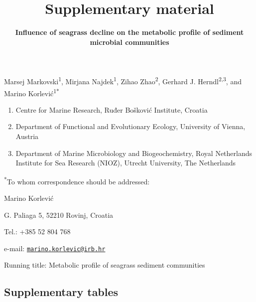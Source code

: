 \documentclass[
  12 pt,
]{article}
\title{\textbf{Supplementary material}}
\subtitle{\textbf{Influence of seagrass decline on the metabolic profile of sediment microbial communities}}
\author{}
\date{\vspace{-2.5em}}
\begin{document}
\maketitle


\renewcommand{\figurename}{Supplementary Figure}
\renewcommand{\tablename}{Supplementary Table}
\renewcommand{\thefigure}{S\arabic{figure}}
\renewcommand{\thetable}{S\arabic{table}}

\vspace{\fill}

Marsej Markovski\textsuperscript{1}, Mirjana Najdek\textsuperscript{1}, Zihao Zhao\textsuperscript{2}, Gerhard J. Herndl\textsuperscript{2,3}, and Marino Korlević\textsuperscript{1*}

\begin{enumerate}
\def\labelenumi{\arabic{enumi}.}
\item
  Centre for Marine Research, Ruđer Bošković Institute, Croatia
\item
  Department of Functional and Evolutionary Ecology, University of Vienna, Austria
\item
  Department of Marine Microbiology and Biogeochemistry, Royal Netherlands Institute for Sea Research (NIOZ), Utrecht University, The Netherlands
\end{enumerate}

\textsuperscript{*}To whom correspondence should be addressed:

Marino Korlević

G. Paliaga 5, 52210 Rovinj, Croatia

Tel.: +385 52 804 768

e-mail: \href{mailto:marino.korlevic@irb.hr}{\nolinkurl{marino.korlevic@irb.hr}}

Running title: Metabolic profile of seagrass sediment communities

\setlength\parindent{24pt}
\newpage

\hypertarget{supplementary-tables}{%
\subsection{Supplementary tables}\label{supplementary-tables}}
\end{document}

